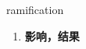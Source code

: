 
\begin{frame}
{\huge ramification}
\begin{center}
\begin{enumerate}\Large
  \item \textbf{影响，结果}
\end{enumerate}
\end{center}
\end{frame}
